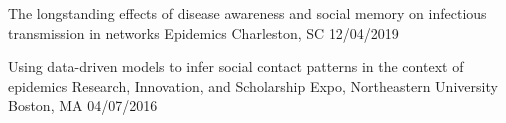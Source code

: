 \begin{cventries}

  \cvpresentation
    {The longstanding effects of disease awareness and social memory on infectious transmission in networks} %
    {Epidemics} %
    {Charleston, SC} %
    {12/04/2019} %
    


  \cvpresentation
    {Using data-driven models to infer social contact patterns in the context of epidemics} %
    {Research, Innovation, and Scholarship Expo, Northeastern University} %
    {Boston, MA} %
    {04/07/2016} %
    
\end{cventries}